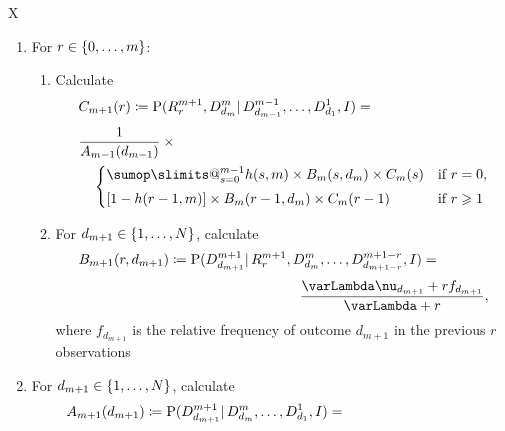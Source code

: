 \documentclass[\ifafour a4paper,12pt,\else a5paper,10pt,\fi%
onecolumn,oneside,article,%
british%
]{memoir}
\makeatletter
\theoremstyle{remark}
\theoremstyle{innote}
\def\sum{\DOTSI\sumop\slimits@}
\newcommand*{\defd}{\coloneqq}
\renewcommand{\le}{\leqslant}%
\renewcommand{\ge}{\geqslant}%
\DeclarePairedDelimiter\set{\{}{\}}
\newcommand*{\p}{\mathrm{P}}%
\renewcommand*{\|}{\mathpunct{|}}
\newcommand*{\yff}{f}
\newcommand*{\yN}{\varLambda}
\newcommand*{\ynn}{\nu}
\newcommand*{\yI}{I}
\newcommand*{\yrs}{h}
\makeatother
\begin{document}
\begin{table}[!b]
  \centering
  \caption{Predictive algorithm}
  \label{tab:adamsetal_algorithm}
  \begin{tabularx}{\textwidth}{X}\hline
    \begin{enumerate}
    \item\label{item:first_step}For $r \in \set{0,\dotsc, m}$:
      \begin{enumerate}[label*=\arabic*.]
      \item Calculate
        \[ \begin{multlined}[t][0.85\textwidth] C_{m+1}(r) \defd
            \p(R^{m+1}_{r} , D^{m}_{d_{m}} \| D^{m-1}_{d_{m-1}}, \dotsc,
            D^{1}_{d_{1}}, \yI) ={}\\[\jot]
       \shoveleft{\frac{1}{A_{m-1}(d_{m-1})} \times{}}\\\begin{cases}
          \sum_{s=0}^{m-1} \yrs(s,m) \times B_m(s,d_m) \times C_m(s) & \text{if $r=0$},
          \\[\jot]
          [1-\yrs(r-1,m)]  \times B_m(r-1,d_m) \times C_m(r-1)& \text{if $r\ge 1$}    
        \end{cases}
      \end{multlined}
    \]
      \item For $d_{m+1} \in \set{1,\dotsc,N}$, calculate
        \[ \begin{multlined}[][0.85\textwidth]
B_{m+1}(r,d_{m+1}) \defd \p(D^{m+1}_{d_{m+1}} \| R^{m+1}_{r}, D^{m}_{d_{m}},
          \dotsc, D^{m+1-r}_{d_{m+1-r}}, \yI) ={}\\[\jot]
         \frac{\yN\ynn_{d_{m+1}}+r\yff_{d_{m+1}}}{\yN + r},
       \end{multlined} \]
     where $\yff_{d_{m+1}}$ is the relative frequency of outcome $d_{m+1}$ in the previous $r$ observations
  \end{enumerate}
\item For $d_{m+1} \in \set{1,\dotsc,N}$, calculate
  \[ \begin{multlined}[][0.85\textwidth]
      A_{m+1}(d_{m+1}) \defd \p(D^{m+1}_{d_{m+1}} \| D^{m}_{d_{m}}, \dotsc, D^{1}_{d_{1}}, \yI) ={}\\[\jot]

\end{multlined}\]
\end{enumerate}
\end{tabularx}
\end{table}
\end{document}
